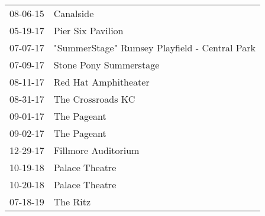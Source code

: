 \begin{supertabular}{p{0.25\columnwidth}p{0.75\columnwidth}}
 08-06-15 &                                      Canalside \\
 05-19-17 &                              Pier Six Pavilion \\
 07-07-17 &  "SummerStage" Rumsey Playfield - Central Park \\
 07-09-17 &                         Stone Pony Summerstage \\
 08-11-17 &                           Red Hat Amphitheater \\
 08-31-17 &                              The Crossroads KC \\
 09-01-17 &                                    The Pageant \\
 09-02-17 &                                    The Pageant \\
 12-29-17 &                            Fillmore Auditorium \\
 10-19-18 &                                 Palace Theatre \\
 10-20-18 &                                 Palace Theatre \\
 07-18-19 &                                       The Ritz \\
\end{supertabular}

